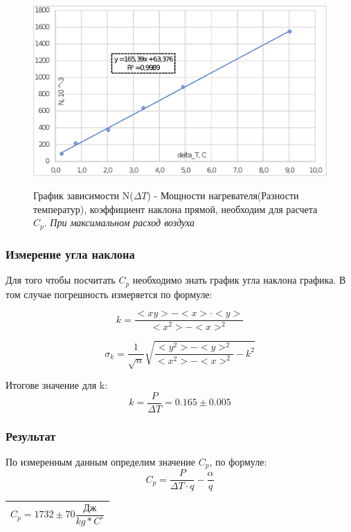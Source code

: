 \documentclass[a4paper,12pt]{article}
\theoremstyle{plain} %
\theoremstyle{definition} %
\theoremstyle{remark} %
\begin{document}
\begin{figure}[H]
{\includegraphics[width=1\linewidth]{graph1.eps}}
\caption{График зависимости N($\Delta T$) - Мощности нагревателя(Разности температур), коэффициент наклона прямой, необходим для расчета $C_p$. \textit{При максимальном расход воздуха}}
\end{figure}

\subsubsection{Измерение угла наклона}
Для того чтобы посчитать $C_p$ необходимо знать график угла наклона графика. В 
том случае погрешность измеряется по формуле:

\begin{equation}
k = \dfrac{<xy> - <x> \cdot <y>}{<x^2> - <x>^2}
\end{equation}

\begin{equation}
\sigma_k = \dfrac{1}{\sqrt{n}} \sqrt{\dfrac{<y^2> - <y>^2}{<x^2> - <x>^2} - k^2}
\end{equation}

\large{Итогове значение для k}:
\[k = \frac{P}{\Delta T} = 0.165 \pm 0.005 \]

\subsubsection{Результат}
По измеренным данным определим значение $C_p$, по формуле:
\[C_p = \dfrac{P}{\Delta T \cdot q} - \dfrac{\alpha}{q} \]

\begin{center}
\begin{tabular}{|c|}
\hline 
$C_p = 1732 \pm 70 \dfrac{\text{Дж}}{kg * C^\circ} $ \\ 
\hline 
\end{tabular} 
\end{center}
\end{document}
